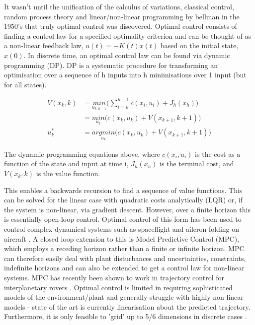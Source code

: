 \documentclass[../main.tex]{subfiles}
\begin{document}
It wasn't until the unification of the calculus of variations, classical control, random process theory and linear/non-linear programming by bellman in the 1950's \cite{History} that truly optimal control was discovered. Optimal control consists of finding a control law for a specified optimality criterion and can be thought of as a non-linear feedback law, $u(t) = -K(t)x(t)$ based on the initial state, $x(0)$. In discrete time, an optimal control law can be found via dynamic programming (DP). DP is a systematic procedure for transforming an optimisation over a sequence of h inputs into h minimisations over 1 input (but for all states).

\begin{align}
    \label{equ:detval} 
    V(x_k, k) & = \underset{u_{k:h-1}}{min} \bigg( \sum_{i=k}^{h-1} c(x_i, u_i) + J_h(x_h) \bigg) \\ 
    & = \underset{u_k}{min} \Big( c(x_k, u_k) + V(x_{k+1}, k+1) \Big) \\
    u^{*}_k & = \underset{u_k}{argmin} \Big( c(x_k, u_k) + V(x_{k+1}, k+1) \Big)
\end{align}

The dynamic programming equations above, where $c(x_i, u_i)$ is the cost as a function of the state and input at time i, $J_h(x_h)$ is the terminal cost, and $V(x_k, k)$ is the value function.

This enables a backwards recursion to find a sequence of value functions. This can be solved for the linear case with quadratic costs analytically (LQR) or, if the system is non-linear, via gradient descent. However, over a finite horizon this is essentially open-loop control. Optimal control of this form has been used to control complex dynamical systems such as spaceflight and aileron folding on aircraft \cite{aircraftoptcont, aileronoptcont}. A closed loop extension to this is Model Predictive Control (MPC), which employs a receding horizon rather than a finite or infinite horizon. MPC can therefore easily deal with plant disturbances and uncertainties, constraints, indefinite horizons and can also be extended to get a control law for non-linear systems. MPC has recently been shown to work in trajectory control for interplanetary rovers \cite{rovermpc}. Optimal control is limited in requiring sophisticated models of the environment/plant and generally struggle with highly non-linear models - state of the art is currently linearisation about the predicted trajectory. Furthermore, it is only feasible to 'grid' up to 5/6 dimensions in discrete cases \cite{4f3}. 
\end{document}

